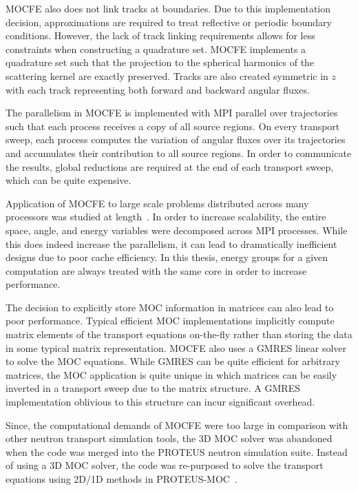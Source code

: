 MOCFE also does not link tracks at boundaries. Due to this implementation decision, approximations are required to treat reflective or periodic boundary conditions. However, the lack of track linking requirements allows for less constraints when constructing a quadrature set. MOCFE implements a quadrature set such that the projection to the spherical harmonics of the scattering kernel are exactly preserved. Tracks are also created symmetric in $z$ with each track representing both forward and backward angular fluxes.

The parallelism in MOCFE is implemented with \ac{MPI} parallel over trajectories such that each process receives a copy of all source regions. On every transport sweep, each process computes the variation of angular fluxes over its trajectories and accumulates their contribution to all source regions. In order to communicate the results, global reductions are required at the end of each transport sweep, which can be quite expensive.

Application of MOCFE to large scale problems distributed across many processors was studied at length~\cite{mocfe_bgp}. In order to increase scalability, the entire space, angle, and energy variables were decomposed across \ac{MPI} processes. While this does indeed increase the parallelism, it can lead to dramatically inefficient designs due to poor cache efficiency. In this thesis, energy groups for a given computation are always treated with the same core in order to increase performance.

The decision to explicitly store \ac{MOC} information in matrices can also lead to poor performance. Typical efficient \ac{MOC} implementations implicitly compute matrix elements of the transport equations on-the-fly rather than storing the data in some typical matrix representation.  MOCFE also uses a \ac{GMRES} linear solver to solve the \ac{MOC} equations. While \ac{GMRES} can be quite efficient for arbitrary matrices, the  \ac{MOC} application is quite unique in which matrices can be easily inverted in a transport sweep due to the matrix structure. A \ac{GMRES} implementation oblivious to this structure can incur significant overhead.

Since, the computational demands of MOCFE were too large in comparison with other neutron transport simulation tools, the 3D \ac{MOC} solver was abandoned when the code was merged into the PROTEUS neutron simulation suite. Instead of using a 3D \ac{MOC} solver, the code was re-purposed to solve the transport equations using 2D/1D methods in PROTEUS-MOC~\cite{proteus}.

